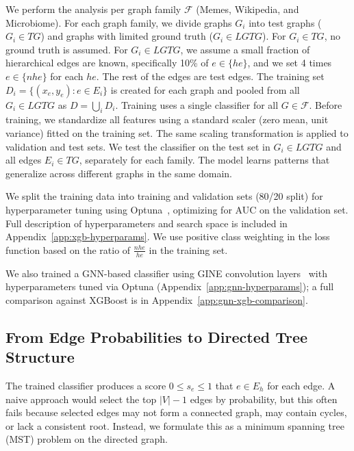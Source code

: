 \documentclass{article}
\begin{document}
    We perform the analysis per graph family $\mathcal{F}$ (Memes, Wikipedia, and Microbiome). For each graph family, we divide graphs $G_{i}$ into test graphs ($G_{i}\in TG$) and graphs with limited ground truth ($G_{i}\in LGTG$). For $G_{i}\in TG$, no ground truth is assumed. For $G_{i}\in LGTG$, we assume a small fraction of hierarchical edges are known, specifically 10\% of $e \in \{he\}$, and we set 4 times $e \in \{nhe\}$ for each $he$. The rest of the edges are test edges. The training set $D_{i}= \{(x_{e}, y_{e}) : e \in E_{i}\}$ is created for each graph and pooled from all $G_{i}\in LGTG$ as $D = \bigcup_{i}D_{i}$. Training uses a single classifier for all $G \in \mathcal{F}$. Before training, we standardize all features using a standard scaler (zero mean, unit variance) fitted on the training set. The same scaling transformation is applied to validation and test sets. We test the classifier on the test set in $G_{i}\in LGTG$ and all edges $E_{i}\in TG$, separately for each family. The model learns patterns that generalize across different graphs in the same domain.

    We split the training data into training and validation sets (80/20 split) for hyperparameter tuning using Optuna~\citep{optuna_2019}, optimizing for AUC on the validation set. Full description of hyperparameters and search space is included in Appendix~\ref{app:xgb-hyperparams}. We use positive class weighting in the loss function based on the ratio of $\frac{nhe}{he}$ in the training set.

    We also trained a GNN-based classifier using GINE convolution layers~\citep{hu2019strategies} with hyperparameters tuned via Optuna (Appendix~\ref{app:gnn-hyperparams}); a full comparison against XGBoost is in Appendix~\ref{app:gnn-xgb-comparison}.

    \subsection{From Edge Probabilities to Directed Tree Structure}
    \label{sec:mst} The trained classifier produces a score $0 \leq s_{e}\leq 1$ that $e \in E_{h}$ for each edge. A naive approach would select the top $|V| - 1$ edges by probability, but this often fails because selected edges may not form a connected graph, may contain cycles, or lack a consistent root. Instead, we formulate this as a minimum spanning tree (MST) problem on the directed graph.
\end{document}
